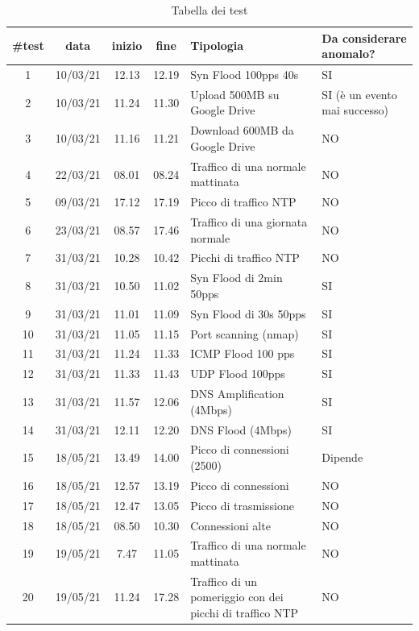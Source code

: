 \FloatBarrier
\begin{table}
    \begin{tabularx}{\textwidth}{||c c c c X X||} 
        \hline
        \#test & data  & inizio & fine & Tipologia & Da considerare anomalo? \\ [0.5ex] 
        \hline\hline
        1 & 10/03/21 & 12.13 & 12.19 & Syn Flood 100pps 40s & SI\\ 
        \hline
        2 & 10/03/21 & 11.24 & 11.30
         & Upload 500MB su Google Drive & SI (è un evento mai successo)\\ 
        \hline
        3 & 10/03/21 & 11.16 & 11.21 & Download 600MB da Google Drive & NO\\ 
        \hline 
        4 & 22/03/21 & 08.01 & 08.24 & Traffico di una normale mattinata & NO\\
        \hline
        5 & 09/03/21 & 17.12 & 17.19 & Picco di traffico NTP & NO\\
        \hline
        6 & 23/03/21 & 08.57 & 17.46
         & Traffico di una giornata normale & NO\\ 
        \hline
        7 & 31/03/21 & 10.28 & 10.42 & Picchi di traffico NTP & NO\\ 
        \hline 
        8 & 31/03/21 & 10.50 & 11.02 & Syn Flood di 2min 50pps & SI\\
        \hline
        9 & 31/03/21 & 11.01 & 11.09 & Syn Flood di 30s 50pps & SI\\        
        \hline
        10 & 31/03/21 & 11.05 & 11.15 & Port scanning (nmap) & SI\\
        \hline
        11 & 31/03/21 & 11.24 & 11.33 & ICMP Flood 100 pps & SI\\
        \hline
        12 & 31/03/21 & 11.33 & 11.43
         & UDP Flood 100pps & SI\\ 
        \hline
        13 & 31/03/21 & 11.57 & 12.06 & DNS Amplification (4Mbps) & SI\\ 
        \hline 
        14 & 31/03/21 & 12.11 & 12.20 & DNS Flood (4Mbps) & SI\\
        \hline
        15 & 18/05/21 & 13.49 & 14.00 & Picco di connessioni (2500) & Dipende \\ %
        \hline 
        16 & 18/05/21 & 12.57 & 13.19 & Picco di connessioni & NO\\        
        \hline
        17 & 18/05/21 & 12.47 & 13.05 & Picco di trasmissione & NO\\        
        \hline
        18 & 18/05/21 & 08.50 & 10.30 & Connessioni alte & NO\\
        \hline
        19 & 19/05/21 & 7.47 & 11.05 & Traffico di una normale mattinata & NO\\ 
        \hline
        20 & 19/05/21 & 11.24 & 17.28 & Traffico di un pomeriggio con dei picchi di traffico NTP & NO\\ 
        \hline
    \end{tabularx}
    \caption{Tabella dei test}
    \label{table:test}
\end{table}
\FloatBarrier

